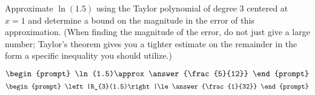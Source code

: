 \documentclass{ximera}
\author{Gregory Hartman \and Matthew Carr}
\begin{document}
\begin{exercise}





Approximate $\ln(1.5)$ using the Taylor polynomial of degree $3$ centered at $x=1$ and determine a bound on the magnitude in the error of this approximation. (When finding the magnitude of the error, do not just give a large number; Taylor's theorem gives you a tighter estimate on the remainder in the form a specific inequality you should utilize.)

\[
\begin{prompt}
\ln(1.5)\approx\answer{\frac{5}{12}}
\end{prompt}
\]
\[
\begin{prompt}
\left|R_{3}(1.5)\right|\le\answer{\frac{1}{32}}
\end{prompt}
\]

\end{exercise}
\end{document}
